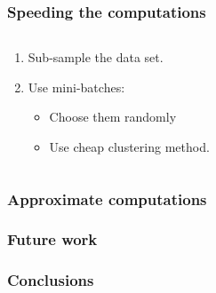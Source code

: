 \documentclass{beamer}
\begin{document}
     \begin{frame}
      \frametitle{Speeding the computations}
      \begin{columns}
		\begin{column}{5cm}
			 \begin{enumerate}
			    \item Sub-sample the data set.
			    \item Use mini-batches:
				\begin{itemize}
				  \item Choose them randomly
				  \item Use cheap clustering method.
				\end{itemize}
			 \end{enumerate}
		\end{column}
		\begin{column}{7cm}
			\\
		\end{column}
	\end{columns}
   \end{frame}

  \begin{frame}
   \frametitle{Approximate computations}
  \end{frame}
% 

  \begin{frame}
      \frametitle{Future work}
   \end{frame}

  \begin{frame}
      \frametitle{Conclusions}
   \end{frame}

  
\end{document}
